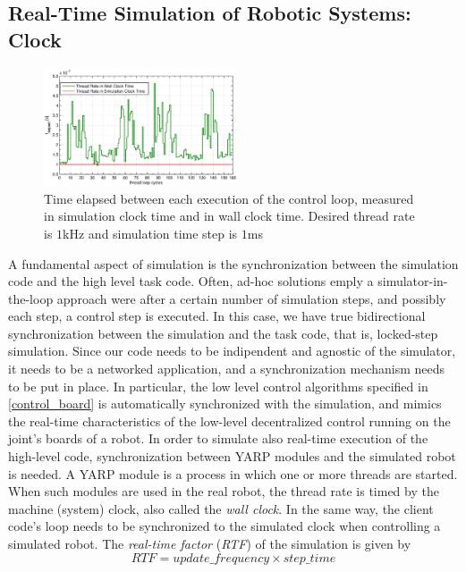 \subsection{Real-Time Simulation of Robotic Systems: Clock}
\begin{figure}
  \centering
    \hspace*{-0.25in}
    \includegraphics[width=0.51\textwidth]{images/yarp_clock.eps}
    \caption{Time elapsed between each execution of the control loop, measured in simulation clock time and in wall clock time. Desired thread rate is $1$kHz and simulation time step is $1$ms}\label{yarp_clock_real_vs_simulated}
\end{figure}
A fundamental aspect of simulation is the synchronization between the simulation code and the high level task code. Often, ad-hoc solutions emply a simulator-in-the-loop approach were after a certain number of simulation steps, and possibly each step, a control step is executed. In this case, we have true bidirectional synchronization between the simulation and the task code, that is, locked-step simulation. Since our code needs to be indipendent and agnostic of the simulator, it needs to be a networked application, and a synchronization mechanism needs to be put in place. In particular, the low level control algorithms specified in \ref{control_board} is automatically synchronized with the simulation, and mimics the real-time characteristics of the low-level decentralized control running on the joint's boards of a robot. In order to simulate also real-time execution of the high-level code, synchronization between YARP modules and the simulated robot is needed.
A YARP module is a process in which one or more threads are started. When such modules are used in the real robot, the thread rate is timed by the machine (system) clock, also called the \emph{wall clock}. In the same way, the client code's loop needs to be synchronized to the simulated clock when controlling a simulated robot.
The \emph{real-time factor} (\emph{RTF}) of the simulation is given by 
\begin{equation}
    RTF = update\_frequency \times step\_time
\end{equation}
